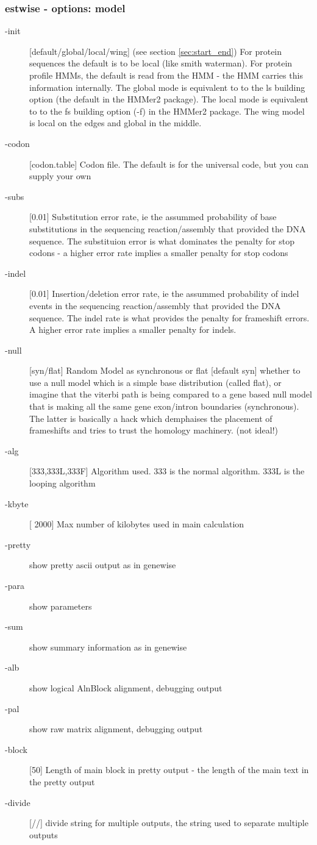 \documentclass{article}
\begin{document}
\subsubsection{estwise - options: model}
\begin{description}
\item[-init]   [default/global/local/wing]  (see section \ref{sec:start_end})
For protein sequences the default is to be local (like
smith waterman). For protein profile HMMs, the default is read from the HMM - the
HMM carries this information internally. The global mode is equivalent to to the ls building option
(the default in the HMMer2 package). The local mode is equivalent to to the fs building option (-f)
in the HMMer2 package. The wing model is local on the edges and global in the middle.

\item[-codon]  [codon.table]  Codon file. The default is for the universal code, but
you can supply your own
\item[-subs]   [0.01] Substitution error rate, ie the assummed probability of base substitutions
in the sequencing reaction/assembly that provided the DNA sequence. The substituion error is what dominates
the penalty for stop codons - a higher error rate implies a smaller penalty for stop codons
\item[-indel]  [0.01] Insertion/deletion error rate, ie the assummed probability of indel events
in the sequencing reaction/assembly that provided the DNA sequence. The indel rate is what provides
the penalty for frameshift errors. A higher error rate implies a smaller penalty for indels.
\item[-null]   [syn/flat]   Random Model as synchronous or flat [default syn]
 whether to use
a null model which is a simple base distribution (called flat), or imagine that the viterbi path
is being compared to a gene based null model that is making all the same gene exon/intron boundaries
(synchronous). The latter is basically a hack which demphaises the placement of frameshifts and
tries to trust the homology machinery. (not ideal!)
\item[-alg]    [333,333L,333F]  Algorithm used. 333 is the normal algorithm. 333L is the looping
algorithm
\item[-kbyte]  [ 2000]  Max number of kilobytes used in main calculation
\item[-pretty]          show pretty ascii output as in genewise
\item[-para]            show parameters 
\item[-sum]             show summary information as in genewise
\item[-alb]             show logical AlnBlock alignment, debugging output 
\item[-pal]             show raw matrix alignment, debugging output
\item[-block]  [50]     Length of main block in pretty output - the length of the main text in the pretty 
output
\item[-divide] [//]     divide string for multiple outputs, the string used to separate multiple outputs
\end{description}
\end{document}
